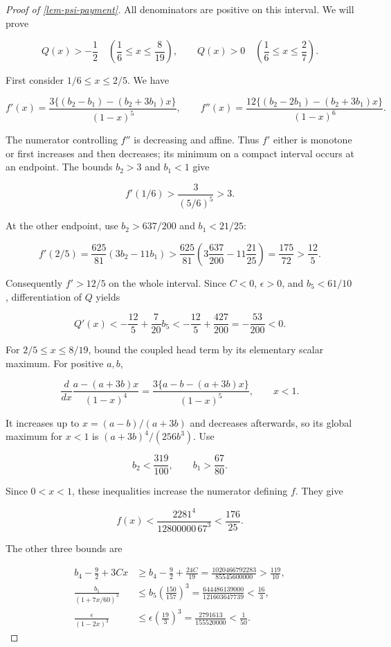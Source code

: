\documentclass[11pt,a4paper]{article}
\theoremstyle{proofmanuscript}
\begin{document}
\begin{proof}[Proof of \ref{lem-psi-payment}]
All denominators are positive on this interval. We will prove

\[
Q(x)>-\frac12\quad\left(\frac16\le x\le\frac8{19}\right),
\qquad
Q(x)>0\quad\left(\frac16\le x\le\frac27\right).
\]

First consider \(1/6\le x\le2/5\). We have

\[
f'(x)=\frac{3\{(b_2-b_1)-(b_2+3b_1)x\}}{(1-x)^5},
\qquad
f''(x)=\frac{12\{(b_2-2b_1)-(b_2+3b_1)x\}}{(1-x)^6}.
\]

The numerator controlling \(f''\) is decreasing and affine. Thus \(f'\) either is monotone or first increases and then decreases; its minimum on a compact interval occurs at an endpoint. The bounds \(b_2>3\) and \(b_1<1\) give

\[
f'(1/6)>\frac{3}{(5/6)^5}>3.
\]

At the other endpoint, use \(b_2>637/200\) and \(b_1<21/25\):

\[
f'(2/5)=\frac{625}{81}(3b_2-11b_1)
>\frac{625}{81}\left(3\frac{637}{200}-11\frac{21}{25}\right)
=\frac{175}{72}>\frac{12}{5}.
\]

Consequently \(f'>12/5\) on the whole interval. Since \(C<0\), \(\epsilon>0\), and \(b_5<61/10\), differentiation of \(Q\) yields

\[
Q'(x)<-\frac{12}{5}+\frac7{20}b_5
<-\frac{12}{5}+\frac{427}{200}=-\frac{53}{200}<0.
\]

For \(2/5\le x\le8/19\), bound the coupled head term by its elementary scalar maximum. For positive \(a,b\),

\[
\frac{d}{dx}\frac{a-(a+3b)x}{(1-x)^4}
=\frac{3\{a-b-(a+3b)x\}}{(1-x)^5},\qquad x<1.
\]

It increases up to \(x=(a-b)/(a+3b)\) and decreases afterwards, so its global maximum for \(x<1\) is \((a+3b)^4/(256b^3)\). Use

\[
b_2<\frac{319}{100},\qquad b_1>\frac{67}{80}.
\]

Since \(0<x<1\), these inequalities increase the numerator defining \(f\). They give

\[
f(x)<\frac{2281^4}{12800000\,67^3}<\frac{176}{25}.
\]

The other three bounds are

\[
\begin{aligned}
b_4-\frac92+3Cx
&\ge b_4-\frac92+\frac{24C}{19}
=\frac{1020466792283}{85545600000}>\frac{119}{10},\\
\frac{b_5}{(1+7x/60)^3}
&\le b_5\left(\frac{150}{157}\right)^3
=\frac{644486139000}{121603647739}<\frac{16}{3},\\
\frac{\epsilon}{(1-2x)^3}
&\le\epsilon\left(\frac{19}{3}\right)^3
=\frac{2791613}{155520000}<\frac1{50}.
\end{aligned}
\]


\end{proof}
\end{document}
